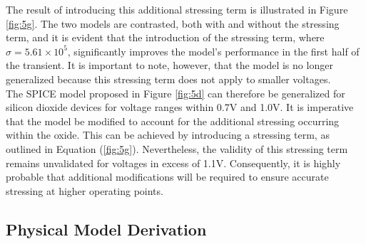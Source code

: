 

\noindent The result of introducing this additional stressing term is illustrated in Figure \ref{fig:5g}. The two models are contrasted, both with and without the stressing term, and it is evident that the introduction of the stressing term, where $\sigma = 5.61 \times 10^5$, significantly improves the model's performance in the first half of the transient. It is important to note, however, that the model is no longer generalized because this stressing term does not apply to smaller voltages. \\

\noindent The SPICE model proposed in Figure \ref{fig:5d} can therefore be generalized for silicon dioxide devices for voltage ranges within 0.7V and 1.0V. It is imperative that the model be modified to account for the additional stressing occurring within the oxide. This can be achieved by introducing a stressing term, as outlined in Equation (\ref{fig:5g}). Nevertheless, the validity of this stressing term remains unvalidated for voltages in excess of 1.1V. Consequently, it is highly probable that additional modifications will be required to ensure accurate stressing at higher operating points.

\subsection[Physical Model Derivation]{Physical Model Derivation}

